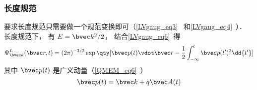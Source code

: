 \subsubsection{长度规范}
要求长度规范只需要做一个规范变换即可（\autoref{LVgaug_eq3}~ 和\autoref{LVgaug_eq4}~）． 长度规范下， 有 $E = \bvec k^2/2$， 结合\autoref{LVgaug_eq6}~得
\begin{equation}
\Psi_{\bvec k}^L(\bvec r, t) = (2\pi)^{-3/2} \exp\qty[\bvec p(t)\vdot \bvec r - \frac{1}{2}\int_{-\infty}^t \bvec p(t')^2 \dd{t'}]
\end{equation}
其中 $\bvec p(t)$ 是广义动量（\autoref{QMEM_eq6}~）
\begin{equation}
\bvec p(t) = \bvec k + q\bvec A(t)
\end{equation}

